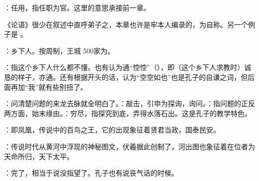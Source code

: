 {
\begin{lyblobitemize}
\item {}：任用，指任职为官。这里的意思承接前一章。
\end{lyblobitemize}
《论语》很少在叙述中直呼弟子之，本章也许是牢本人编录的，为自称。另一个例子是  。
}
{}


{
\item {}：乡下人。按周制，王城 500家为。
\item {}：指这个乡下人什么都不懂。也有认为通“悾悾”（），即（这个乡下人求教时）诚恳的样子，亦通。还有根据开头的话，认为“空空如也”也是孔子的自谦之词，但后面再加“我”就有些别扭了。
\item {}：问清楚问题的来龙去脉就全明白了。：敲击，引申为探询，询问。：指问题的正反两方面，始末缘由。：穷尽，指探究到底，弄得水落石出。这是孔子的教学特色。
}
{}


{
\item {}：即凤凰，传说中的百鸟之王，它的出现象征着贤君当政，国泰民安。
\item {}：传说时代从黄河中浮现的神秘图文，伏羲据此创制了。河出图也象征着在位者为天命所归，天下太平。
\item {}：完了，相当于说没指望了。孔子也有说丧气话的时候。
}
{}


